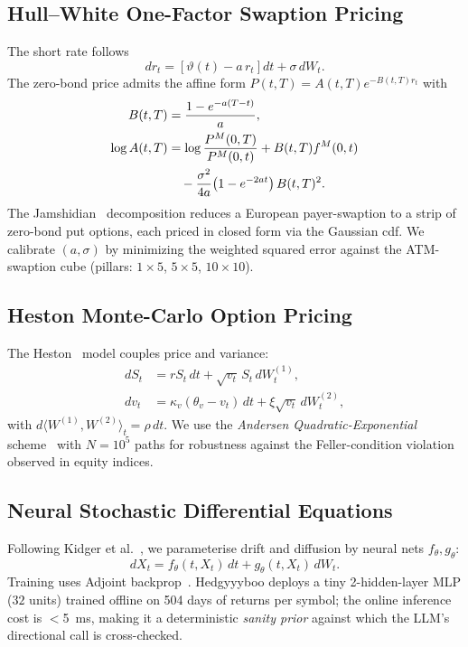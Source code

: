 \documentclass[conference]{IEEEtran}
\begin{document}
\subsection{Hull--White One-Factor Swaption Pricing}
\label{sec:hw}
The short rate follows
\begin{equation}
dr_t = \left[\vartheta(t) - a\,r_t\right]dt + \sigma\,dW_t.
\label{eq:hw}
\end{equation}
The zero-bond price admits the affine form $P(t,T)=A(t,T)e^{-B(t,T)r_t}$ with
\begin{align}
B(t,T) &= \frac{1-e^{-a(T-t)}}{a},\\
\log A(t,T) &= \log\frac{P^M(0,T)}{P^M(0,t)}
            + B(t,T)f^M(0,t)\notag\\
            &\quad- \frac{\sigma^2}{4a}\!\left(1-e^{-2at}\right)B(t,T)^2.
\end{align}
The Jamshidian~\cite{jamshidian1989} decomposition reduces a European payer-swaption to a strip of zero-bond put options, each priced in closed form via the Gaussian cdf. We calibrate $(a,\sigma)$ by minimizing the weighted squared error against the ATM-swaption cube (pillars: $1\!\times\!5$, $5\!\times\!5$, $10\!\times\!10$).

\subsection{Heston Monte-Carlo Option Pricing}
\label{sec:heston}
The Heston~\cite{heston1993} model couples price and variance:
\begin{align}
dS_t &= r S_t\,dt + \sqrt{v_t}\,S_t\,dW_t^{(1)},\\
dv_t &= \kappa_v(\theta_v - v_t)\,dt + \xi\sqrt{v_t}\,dW_t^{(2)},
\end{align}
with $d\langle W^{(1)},W^{(2)}\rangle_t = \rho\,dt$. We use the \emph{Andersen Quadratic-Exponential} scheme~\cite{andersen2008simple} with $N=10^5$ paths for robustness against the Feller-condition violation observed in equity indices.

\subsection{Neural Stochastic Differential Equations}
\label{sec:nsde}
Following Kidger et al.~\cite{kidger2021neural}, we parameterise drift and diffusion by neural nets $f_\theta,g_\theta$:
\begin{equation}
dX_t = f_\theta(t,X_t)\,dt + g_\theta(t,X_t)\,dW_t.
\label{eq:nsde}
\end{equation}
Training uses Adjoint backprop~\cite{chen2018neural}. Hedgyyyboo deploys a tiny 2-hidden-layer MLP ($32$ units) trained offline on 504 days of returns per symbol; the online inference cost is $<$5~ms, making it a deterministic \emph{sanity prior} against which the LLM's directional call is cross-checked.
\end{document}
